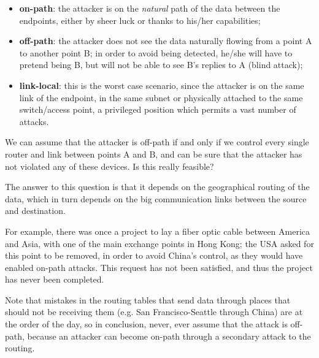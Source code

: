 \begin{itemize}
    \item \textbf{on-path}: the attacker is on the \textit{natural} path of the data between the endpoints, either by sheer luck or thanks to his/her capabilities;
    \item \textbf{off-path}: the attacker does not see the data naturally flowing from a point A to another point B; in order to avoid being detected, he/she will have to pretend being B, but will not be able to see B's replies to A (blind attack);
    \item \textbf{link-local}: this is the worst case scenario, since the attacker is on the same link of the endpoint, in the same subnet or physically attached to the same switch/access point, a privileged position which permits a vast number of attacks.
\end{itemize}

We can assume that the attacker is off-path if and only if we control every single router and link between points A and B, and can be sure that the attacker has not violated any of these devices. Is this really feasible?

The answer to this question is that it depends on the geographical routing of the data, which in turn depends on the big communication links between the source and destination.

For example, there was once a project to lay a fiber optic cable between America and Asia, with one of the main exchange points in Hong Kong; the USA asked for this point to be removed, in order to avoid China's control, as they would have enabled on-path attacks. This request has not been satisfied, and thus the project has never been completed.

Note that mistakes in the routing tables that send data through places that should not be receiving them (e.g. San Francisco-Seattle through China) are at the order of the day, so in conclusion, never, ever assume that the attack is off-path, because an attacker can become on-path through a secondary attack to the routing.